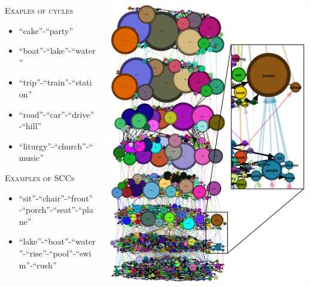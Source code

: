 \begin{minipage}[t]{\textwidth}
    \vspace{-0.4cm}
    \begin{columns}
    \begin{column}{0.33\textwidth}
        {\color{orangeUnicam} \scshape \small Exaples of cycles}
        {\tiny
        \begin{itemize}
            \item “cake”-“party”
            \item “boat”-“lake”-“water”
            \item “trip”-“train”-“station”
            \item “road”-“car”-“drive”-“hill”
            \item “liturgy”-“church”-“music”
        \end{itemize}}
        \medskip
        {\color{orangeUnicam} \scshape \small Examples of SCCs}
        {\tiny
        \begin{itemize}
            \item “sit”-“chair”-“front”-“porch”-“seat”-“plane”
            \item “lake”-“boat”-“water”-“rise”-“pool”-“swim”-“rush”
        \end{itemize}}
    \end{column}
    \hfill
    \begin{column}{0.66\textwidth}
        \includegraphics[height=0.85\textheight]{immagini/grafo_ml_focus}

\end{column}
\end{columns}
\end{minipage}

